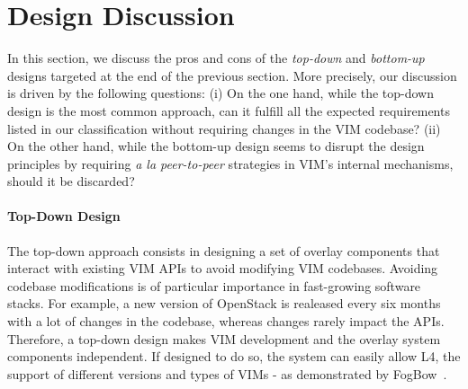 
\vspace*{-.2cm}
\section{Design Discussion}
\label{sec:design_discussion}

In this section, we discuss the pros and cons of the \emph{top-down} and
\emph{bottom-up} designs targeted at the end of the previous section.
More precisely, our discussion is driven by the following questions: (i) On the
one hand, while the top-down design is the most common approach, can it fulfill
all the expected requirements listed in our classification without requiring
changes in the VIM codebase? (ii) On the other hand, while the bottom-up design
seems to disrupt the design principles by requiring \emph{a la peer-to-peer}
strategies in VIM's internal mechanisms, should it be discarded?

\paragraph{Top-Down Design}
The top-down approach consists in designing a set of overlay
components that interact with existing VIM APIs to avoid modifying VIM
codebases.
%
Avoiding codebase modifications is of particular importance in
fast-growing software stacks. For example, a new version of OpenStack
is realeased every six months with a lot of changes in the codebase,
whereas changes rarely impact the APIs.
%
Therefore, a top-down design makes VIM development and the overlay
system components independent. If designed to do so, the system can
easily allow L4, \ie the support of different versions
and types of VIMs - as demonstrated by
FogBow~\cite{brasileiro2016fogbow}.

